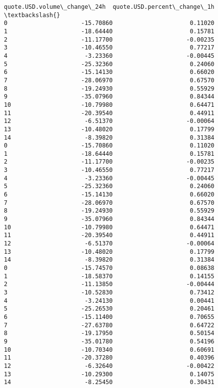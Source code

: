 \documentclass[11pt]{article}
\begin{document}
\begin{tcolorbox}[breakable, size=fbox, boxrule=.5pt, pad at break*=1mm, opacityfill=0]
\begin{Verbatim}[commandchars=\\\{\}]
    quote.USD.volume\_change\_24h  quote.USD.percent\_change\_1h  \textbackslash{}
0                     -15.70860                      0.11020
1                     -18.64440                      0.15781
2                     -11.17700                     -0.00235
3                     -10.46550                      0.77217
4                      -3.23360                     -0.00445
5                     -25.32360                      0.24060
6                     -15.14130                      0.66020
7                     -28.06970                      0.67570
8                     -19.24930                      0.55929
9                     -35.07960                      0.84344
10                    -10.79980                      0.64471
11                    -20.39540                      0.44911
12                     -6.51370                     -0.00064
13                    -10.48020                      0.17799
14                     -8.39820                      0.31384
0                     -15.70860                      0.11020
1                     -18.64440                      0.15781
2                     -11.17700                     -0.00235
3                     -10.46550                      0.77217
4                      -3.23360                     -0.00445
5                     -25.32360                      0.24060
6                     -15.14130                      0.66020
7                     -28.06970                      0.67570
8                     -19.24930                      0.55929
9                     -35.07960                      0.84344
10                    -10.79980                      0.64471
11                    -20.39540                      0.44911
12                     -6.51370                     -0.00064
13                    -10.48020                      0.17799
14                     -8.39820                      0.31384
0                     -15.74570                      0.08638
1                     -18.58370                      0.14155
2                     -11.13850                     -0.00444
3                     -10.52830                      0.73412
4                      -3.24130                      0.00441
5                     -25.26530                      0.20461
6                     -15.11400                      0.70655
7                     -27.63780                      0.64722
8                     -19.17950                      0.50154
9                     -35.01780                      0.54196
10                    -10.70340                      0.60691
11                    -20.37280                      0.40396
12                     -6.32640                     -0.00422
13                    -10.29300                      0.14075
14                     -8.25450                      0.30431


\end{Verbatim}
\end{tcolorbox}
\end{document}
